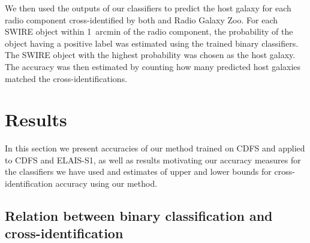 \documentclass[fleqn,usenatbib,usedcolumn]{mnras}
\begin{document}
    We then used the outputs of our classifiers to predict the host galaxy for
    each radio component cross-identified by both \citet{norris06} and Radio
    Galaxy Zoo. For each SWIRE object within 1~arcmin of the radio component,
    the probability of the object having a positive label was estimated using
    the trained binary classifiers. The SWIRE object with the highest
    probability was chosen as the host galaxy. The accuracy was then estimated
    by counting how many predicted host galaxies matched the \citet{norris06}
    cross-identifications.

\section{Results}\label{sec:results}

  In this section we present accuracies of our method trained on CDFS and
  applied to CDFS and ELAIS-S1, as well as results motivating our accuracy
  measures for the classifiers we have used and estimates of upper and lower
  bounds for cross-identification accuracy using our method.

  \subsection{Relation between binary classification and cross-identification}
  \label{sec:relation}
\end{document}
